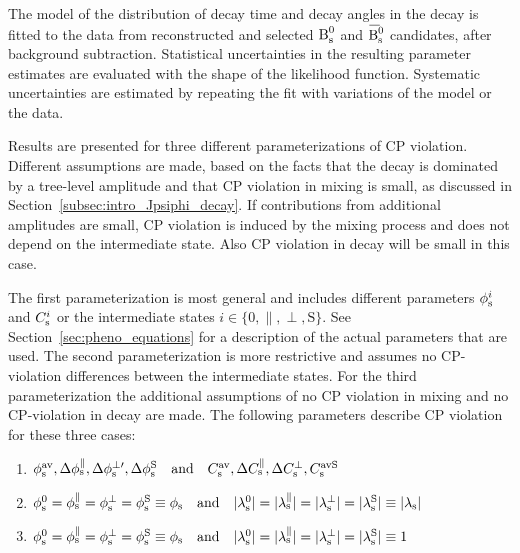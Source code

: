 The model of the distribution of decay time and decay angles in the \BstoJpsiKK{} decay is fitted to the data from reconstructed and
selected $\Bs$ and $\Bsbar$ candidates, after background subtraction. Statistical uncertainties in the resulting parameter estimates are
evaluated with the shape of the likelihood function. Systematic uncertainties are estimated by repeating the fit with variations of the
model or the data.

Results are presented for three different parameterizations of CP violation. Different assumptions are made, based on the facts that the
\BstoJpsiKK{} decay is dominated by a tree-level amplitude and that CP violation in mixing is small, as discussed in
Section~\ref{subsec:intro_Jpsiphi_decay}. If contributions from additional amplitudes are small, CP violation is induced by the \BsBsbar{}
mixing process and does not depend on the intermediate state. Also CP violation in decay will be small in this case.

The first parameterization is most general and includes different parameters $\phisi$ and $\Csi$ or the intermediate states
$i\in\{\text{0}, \parallel, \perp, \text{S}\}$. See Section~\ref{sec:pheno_equations} for a description of the actual parameters that
are used. The second parameterization is more restrictive and assumes no CP-violation differences between the intermediate states. For the
third parameterization the additional assumptions of no CP violation in mixing and no CP-violation in decay are made. The following
parameters describe CP violation for these three cases:
\begin{enumerate}
  \item $\phisav,\Delphispara,\Delphisperpp,\DelphisS
         \quad\text{and}\quad\Csav,\DelCspara,\DelCsperp,\CsavS$
  \item $\phisi[\text{0}]=\phisi[\parallel]=\phisi[\perp]=\phisi[\text{S}]\equiv\phis
         \quad\text{and}\quad\lamsiAbs[\text{0}]=\lamsiAbs[\parallel]=\lamsiAbs[\perp]=\lamsiAbs[\text{S}]\equiv\lamsAbs$
  \item $\phisi[\text{0}]=\phisi[\parallel]=\phisi[\perp]=\phisi[\text{S}]\equiv\phis
         \quad\text{and}\quad\lamsiAbs[\text{0}]=\lamsiAbs[\parallel]=\lamsiAbs[\perp]=\lamsiAbs[\text{S}]\equiv1$
\end{enumerate}

